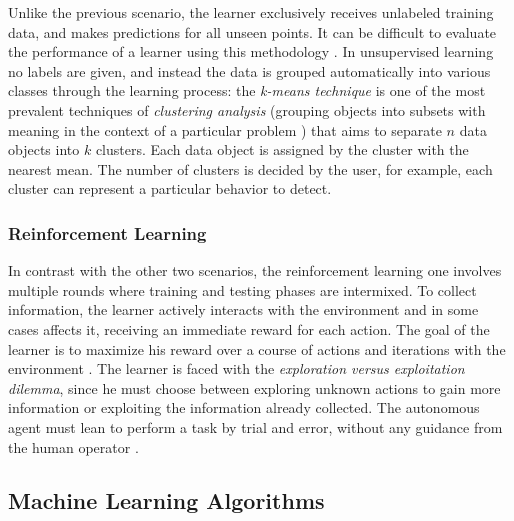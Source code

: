 Unlike the previous scenario, the learner exclusively receives unlabeled training data, and makes predictions for all unseen points. It can be difficult to evaluate the performance of a learner using this methodology \cite[p. 6]{Mohri2018}. In unsupervised learning no labels are given, and instead the data is grouped automatically into various classes through the learning process: the \textit{k-means technique} is one of the most prevalent techniques of \textit{clustering analysis} (grouping objects into subsets with meaning in the context of a particular problem \cite{Annachhatre2015}) that aims to separate $n$ data objects into $k$ clusters. Each data object is assigned by the cluster with the nearest mean. The number of clusters is decided by the user, for example, each cluster can represent a particular behavior to detect.


\subsubsection{Reinforcement Learning}
\label{subsubsec:reinforcement-learning}

In contrast with the other two scenarios, the reinforcement learning one involves multiple rounds where training and testing phases are intermixed. To collect information, the learner actively interacts with the environment and in some cases affects it, receiving an immediate reward for each action. The goal of the learner is to maximize his reward over a course of actions and iterations with the environment \cite[p. 7]{Mohri2018}. The learner is faced with the \textit{exploration versus exploitation dilemma}, since he must choose between exploring unknown actions to gain more information or exploiting the information already collected. The autonomous agent must lean to perform a task by trial and error, without any guidance from the human operator \cite[p. 25]{Goodfellow2016}.


\subsection{Machine Learning Algorithms}
\label{subsec:ml-algorithms}

